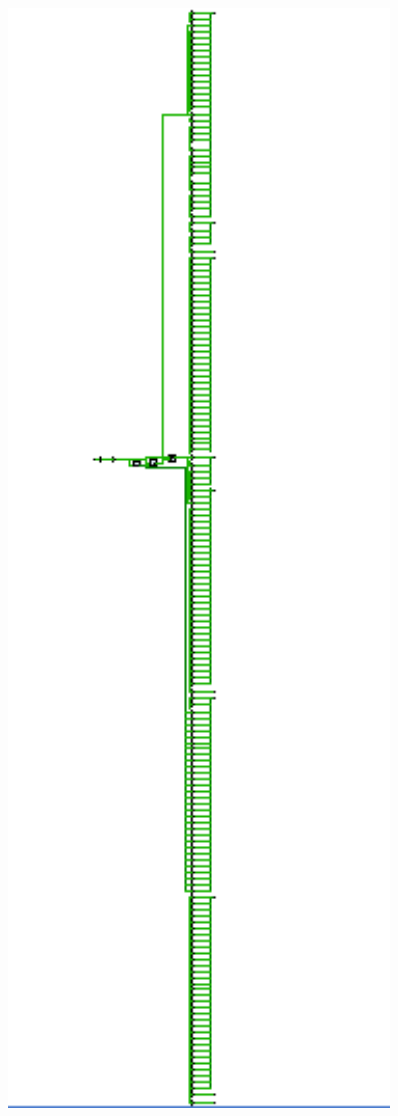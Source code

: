 \documentclass[11pt]{article}
\begin{document}
\begin{center}
    \includegraphics[width = 1\textwidth]{Schematic.png}


\end{center}
\end{document}
